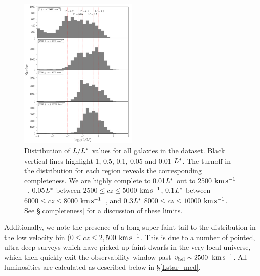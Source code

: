 \documentclass[twocolumn,tighten]{aastex62}
\newcommand{\kms}{$\rm km\, s^{-1}$}
\begin{document}
\begin{figure}[ht!]
        \centering
        \vspace{0pt}
        \includegraphics[width=0.50\textwidth]{Lstar_histogram_4bins_final_0-10000_v3_vert_flag0.pdf}
        \caption{\small{Distribution of $L/L^{\**}$ values for all galaxies in the dataset. Black vertical lines highlight 1, 0.5, 0.1, 0.05 and 0.01 $L^{\**}$. The turnoff in the distribution for each region reveals the corresponding completeness. We are highly complete to 0.01$L^{\**}$ out to 2500 \kms~, 0.05$L^{\**}$ between $2500 \leq cz \leq 5000$ \kms, 0.1$L^{\**}$ between $6000 \leq cz \leq 8000$ \kms~, and 0.3$L^{\**}$ $8000 \leq cz \leq 10000$ \kms. See \S \ref{completeness} for a discussion of these limits.}}
        \vspace{5pt}
        \label{completeness_plot}
\end{figure} 


Additionally, we note the presence of a long super-faint tail to the distribution in the low velocity bin ($0 \leq cz \leq 2,500$ \kms. This is due to a number of pointed, ultra-deep surveys which have picked up faint dwarfs in the very local universe, which then quickly exit the observability window past $v_{\rm hel} \sim 2500$ \kms. All luminosities are calculated as described below in \S \ref{Lstar_med}.
\end{document}
